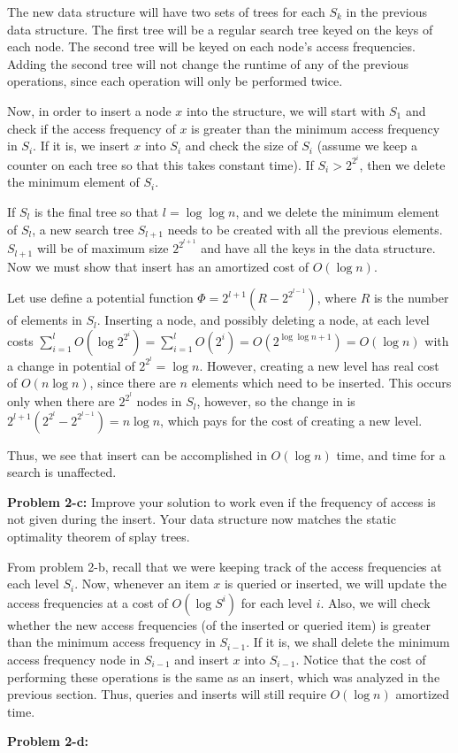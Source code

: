 \documentclass[psamsfonts]{amsart}
\newenvironment{sol}{\vspace{0.25cm}{\large \bfseries Solution:}}{\qedsymbol}
\newenvironment{prob}[1]{\begin{framed}{\large \bfseries Problem #1:}}{\end{framed}}
\begin{document}
\begin{sol}
The new data structure will have two sets of trees for each $S_k$ in the previous data structure. The first tree will be a regular search tree keyed on the keys of each node. The second tree will be keyed on each node's access frequencies. Adding the second tree will not change the runtime of any of the previous operations, since each operation will only be performed twice. 

Now, in order to insert a node $x$ into the structure, we will start with $S_1$ and check if the access frequency of $x$ is greater than the minimum access frequency in $S_i$. If it is, we insert $x$ into $S_i$ and check the size of $S_i$ (assume we keep a counter on each tree so that this takes constant time). If $S_i > 2^{2^i}$, then we delete the minimum element of $S_i$. 

If $S_l$ is the final tree so that $l = \log \log n$, and we delete the minimum element of $S_l$, a new search tree $S_{l+1}$ needs to be created with all the previous elements. $S_{l+1}$ will be of maximum size $2^{2^{l+1}}$ and have all the keys in the data structure. Now we must show that insert has an amortized cost of $O(\log n)$. 

Let use define a potential function $\Phi = 2^{l+1}(R - 2^{2^{l-1}})$, where $R$ is the number of elements in $S_l$. Inserting a node, and possibly deleting a node, at each level costs $\sum_{i=1}^l O(\log 2^{2^{i}}) = \sum_{i=1}^l O(2^i) = O(2^{\log \log n + 1}) = O(\log n)$ with a change in potential of $2^{2^{l}} = \log n$. However, creating a new level has real cost of $O(n \log n)$, since there are $n$ elements which need to be inserted. This occurs only when there are $2^{2^l}$ nodes in $S_l$, however, so the change in is $2^{l+1}(2^{2^l} - 2^{2^{l-1}}) = n \log n$, which pays for the cost of creating a new level.

Thus, we see that insert can be accomplished in $O(\log n)$ time, and time for a search is unaffected.
\end{sol}

\begin{prob}{2-c}
Improve your solution to work even if the frequency of access is not given during the insert. Your data structure now matches the static optimality theorem of splay trees.
\end{prob}

\begin{sol}
From problem 2-b, recall that we were keeping track of the access frequencies at each level $S_i$. Now, whenever an item $x$ is queried or inserted, we will update the access frequencies at a cost of $O(\log S^i)$ for each level $i$. Also, we will check whether the new access frequencies (of the inserted or queried item) is greater than the minimum access frequency in $S_{i-1}$. If it is, we shall delete the minimum access frequency node in $S_{i-1}$ and insert $x$ into $S_{i-1}$. Notice that the cost of performing these operations is the same as an insert, which was analyzed in the previous section. Thus, queries and inserts will still require $O(\log n)$ amortized time. 
\end{sol}

\begin{prob}{2-d}
\end{prob}
\begin{sol}
\end{sol}
\end{document}

